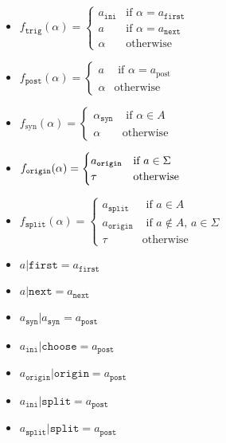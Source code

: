 \documentclass[../hons_project.tex]{subfiles}
\begin{document}
\begin{multicols}{2}
	\begin{itemize}[leftmargin=*]
		\item $f_{\mathtt{trig}}(\alpha) = \begin{cases}
			a_{\mathtt{ini}} & \text{if } \alpha = a_{\mathtt{first}} \\
			a                & \text{if } \alpha = a_{\mathtt{next}}  \\
			\alpha           & \text{otherwise}
		\end{cases}$
		
		\item $f_{\mathtt{post}}(\alpha) = \begin{cases}
			a      & \text{ if } \alpha = a_{\mathrm{post}} \\
			\alpha & \text{otherwise}
		\end{cases}$
		
		\item $f_{\mathrm{syn}}(\alpha) = \begin{cases}
				      \alpha_{\mathtt{syn}} & \text{ if } \alpha\in A \\
				      \alpha                & \text{otherwise}
			      \end{cases}$
				  
		\item $f_{\mathtt{origin}}(\alpha) = \begin{cases}
				      a_{\mathtt{origin}} & \text{if } a\in\Sigma \\
				      \tau                & \text{otherwise}
			      \end{cases}$
		\item $f_{\mathtt{split}}(\alpha) = \begin{cases}
				      a_{\mathtt{split}}  & \text{ if } a\in A                    \\
				      a_{\mathtt{origin}} & \text{ if } a\not\in A,\, a\in \Sigma \\
				      \tau                & \mathrm{otherwise}
			      \end{cases}$
	\end{itemize}
\end{multicols}

\begin{multicols}{3}
	\begin{itemize}[leftmargin=*]
		\item $a | \mathtt{first} = a_{\mathtt{first}}$
		\item $a | \mathtt{next} = a_{\mathtt{next}} $
		\item $a_{\mathtt{syn}} | a_{\mathtt{syn}} = a_{\mathtt{post}}$
		\item $a_{\mathtt{ini}} | \mathtt{choose} = a_{\mathtt{post}}$
		\item $a_{\mathtt{origin}} | \mathtt{origin} = a_{\mathtt{post}}$
		\item $a_{\mathtt{ini}} | \mathtt{split} = a_{\mathtt{post}}$
		\item $a_{\mathtt{split}} | \mathtt{split} = a_{\mathtt{post}}$
	\end{itemize}
\end{multicols}
\end{document}
